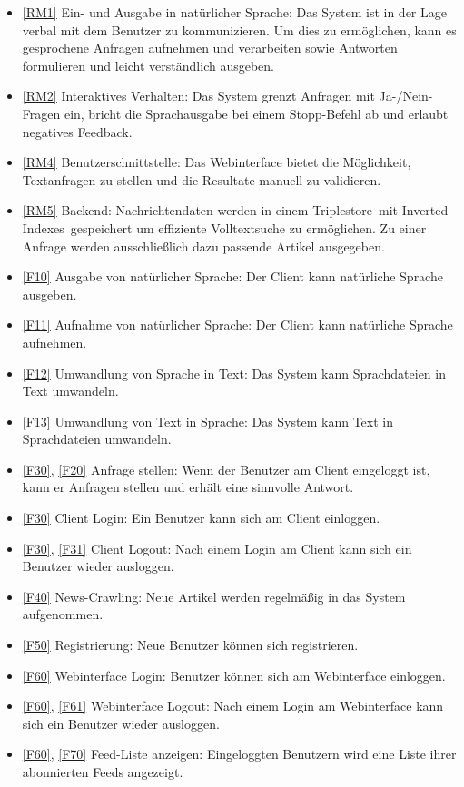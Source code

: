 \begin{itemize}
\item \ref{RM1} Ein- und Ausgabe in natürlicher Sprache:  Das System ist in der Lage verbal mit dem Benutzer zu kommunizieren.
Um dies zu ermöglichen, kann es gesprochene Anfragen aufnehmen und verarbeiten sowie Antworten formulieren und leicht verständlich ausgeben.
\item \ref{RM2} Interaktives Verhalten: Das System grenzt Anfragen mit Ja-/Nein-Fragen ein, bricht die Sprachausgabe bei einem Stopp-Befehl ab und erlaubt negatives Feedback.
\item \ref{RM4} Benutzerschnittstelle: Das Webinterface bietet die Möglichkeit, Textanfragen zu stellen und die Resultate manuell zu validieren.
\item \ref{RM5} Backend: Nachrichtendaten werden in einem \glqq Triplestore\grqq\ mit \glqq Inverted Indexes\grqq\ gespeichert um effiziente Volltextsuche zu ermöglichen. Zu einer Anfrage werden ausschließlich dazu passende Artikel ausgegeben.
\item \ref{F10} Ausgabe von natürlicher Sprache: Der Client kann natürliche Sprache ausgeben.
\item \ref{F11} Aufnahme von natürlicher Sprache: Der Client kann natürliche Sprache aufnehmen.
\item \ref{F12} Umwandlung von Sprache in Text: Das System kann Sprachdateien in Text umwandeln.
\item \ref{F13} Umwandlung von Text in Sprache: Das System kann Text in Sprachdateien umwandeln.
\item \ref{F30}, \ref{F20} Anfrage stellen: Wenn der Benutzer am Client eingeloggt ist, kann er Anfragen stellen und erhält eine sinnvolle Antwort.
\item \ref{F30} Client Login: Ein Benutzer kann sich am Client einloggen.
\item \ref{F30}, \ref{F31} Client Logout: Nach einem Login am Client kann sich ein Benutzer wieder ausloggen.
\item \ref{F40} News-Crawling: Neue Artikel werden regelmäßig in das System aufgenommen.
\item \ref{F50} Registrierung: Neue Benutzer können sich registrieren.
\item \ref{F60} Webinterface Login: Benutzer können sich am Webinterface einloggen.
\item \ref{F60}, \ref{F61} Webinterface Logout: Nach einem Login am Webinterface kann sich ein Benutzer wieder ausloggen.
\item \ref{F60}, \ref{F70} Feed-Liste anzeigen: Eingeloggten Benutzern wird eine Liste ihrer abonnierten Feeds angezeigt.

\end{itemize}
